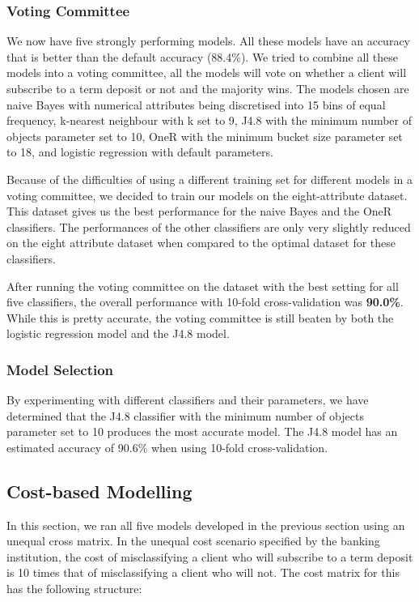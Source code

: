 \documentclass[a4paper,11pt]{article}
\begin{document}
\subsubsection{Voting Committee}

We now have five strongly performing models. All these models have an accuracy that is better than the default accuracy (88.4\%).
We tried to combine all these models into a voting committee, all the models will vote on whether a client will subscribe to a term
deposit or not and the majority wins. The models chosen are naive Bayes with numerical attributes being discretised
into 15 bins of equal frequency, k-nearest neighbour with k set to 9, J4.8 with the minimum number of objects parameter set to 10,
OneR with the minimum bucket size parameter set to 18, and logistic regression with default parameters.

Because of the difficulties of using a different training set for different models in a voting committee, we decided to train
our models on the eight-attribute dataset. This dataset gives us the best performance for the naive Bayes and the OneR
classifiers. The performances of the other classifiers are only very slightly reduced on the eight attribute dataset when compared
to the optimal dataset for these classifiers.

After running the voting committee on the dataset with the best setting for all five classifiers, the overall performance with
10-fold cross-validation was \textbf{90.0\%}. While this is pretty accurate, the voting committee is still beaten by both
the logistic regression model and the J4.8 model.

\subsubsection{Model Selection}

By experimenting with different classifiers and their parameters, we have determined that the J4.8 classifier with the minimum
number of objects parameter set to 10 produces the most accurate model. The J4.8 model has an estimated accuracy of 90.6\%
when using 10-fold cross-validation.

\subsection{Cost-based Modelling}

In this section, we ran all five models developed in the previous section using an unequal cross matrix. In the unequal
cost scenario specified by the banking institution, the cost of misclassifying a client who will subscribe to a term deposit
is 10 times that of misclassifying a client who will not. The cost matrix for this has the following structure:
\end{document}
